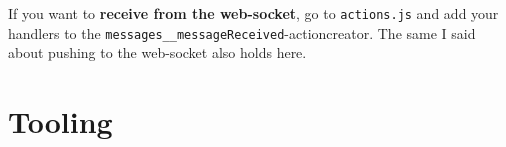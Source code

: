 If you want to \textbf{receive from the web-socket}, go to
\texttt{actions.js} and add your handlers to the
\texttt{messages\_\_messageReceived}-actioncreator. The same I said
about pushing to the web-socket also holds here.
\section{Tooling}\label{tooling}

